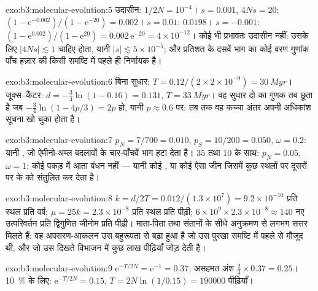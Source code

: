 \begin{solution}{exo:b3:molecular-evolution:5}
उदासीन: $1/2N = 10^{-4}$। $s = 0.001$, $4Ns = 20$: $(1 - \mathrm{e}^{-0.002})/
(1 - \mathrm{e}^{-20}) = 0.002$। $s = 0.01$: $0.0198$। $s = -0.001$: $(1 -
\mathrm{e}^{0.002})/(1 - \mathrm{e}^{20}) = 0.002\,\mathrm{e}^{-20} =
4\times 10^{-12}$। कोई भी प्रभावतः उदासीन नहीं: उसके लिए $|4Ns|
\lesssim 1$ चाहिए होता, यानी $|s| \lesssim 5\times 10^{-5}$; और प्रतिशत
के दसवें भाग का कोई वरण गुणांक पाँच हज़ार की किसी समष्टि में पहले ही
निर्णायक है।
\end{solution}

\begin{solution}{exo:b3:molecular-evolution:6}
बिना सुधार: $T = 0.12/(2\times 2\times 10^{-9}) = \qty{30}{Myr}$।
जूक्स--कैंटर: $d = -\tfrac{3}{4}\ln(1 - 0.16) = 0.131$, $T =
\qty{33}{Myr}$। वह सुधार दो का गुणक तब छूता है जब $-\tfrac{3}{4}
\ln(1 - 4p/3) = 2p$ हो, यानी $p \approx 0.6$ पर: तब तक वह कच्चा अंतर
अपनी अधिकांश सूचना खो चुका होता है।
\end{solution}

\begin{solution}{exo:b3:molecular-evolution:7}
$p_{N} = 7/700 = 0.010$, $p_{S} = 10/200 = 0.050$, $\omega = 0.2$:
यानी , जो ऐमीनो-अम्ल बदलावों के चार-पाँचवें भाग हटा देता है।
$35$ तथा $10$ के साथ: $p_{N} = 0.05$, $\omega = 1$: कोई पकड़ में आता
बंधन नहीं --- यानी कोई , या कोई ऐसा जीन जिसमें कुछ स्थलों पर
 दूसरों पर के  को संतुलित कर देता है।
\end{solution}

\begin{solution}{exo:b3:molecular-evolution:8}
$k = d/2T = 0.012/(1.3\times 10^{7}) = 9.2\times 10^{-10}$ प्रति स्थल
प्रति वर्ष; $\mu = 25k = 2.3\times 10^{-8}$ प्रति स्थल प्रति पीढ़ी;
$6\times
10^{9}\times 2.3\times 10^{-8} \approx 140$ नए उत्परिवर्तन प्रति
द्विगुणित जीनोम प्रति पीढ़ी। माता-पिता तथा संतानों के सीधे अनुक्रमण से
लगभग सत्तर मिलते हैं: वह अपसरण-आकलन उस बहुरूपता से बढ़ा हुआ है जो उस
पुरखा समष्टि में पहले से मौजूद थी, और जो उस दिखते विभाजन में कुछ लाख
पीढ़ियाँ जोड़ देती है।
\end{solution}

\begin{solution}{exo:b3:molecular-evolution:9}
$\mathrm{e}^{-T/2N} = \mathrm{e}^{-1} = 0.37$; असहमत अंश $\tfrac{2}{3}
\times 0.37 = 0.25$। \qty{10}{\%} के लिए: $\mathrm{e}^{-T/2N} = 0.15$, $T =
2N\ln(1/0.15) = \num{190000}$ पीढ़ियाँ।
\end{solution}

